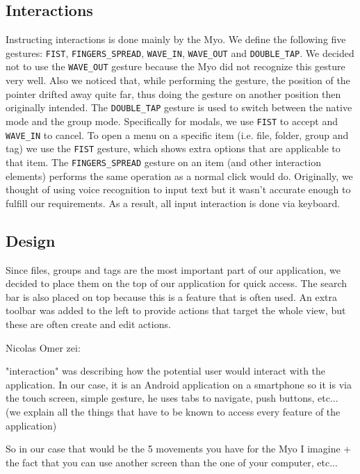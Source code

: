 \documentclass{article}
\begin{document}
\subsection{Interactions}
Instructing interactions is done mainly by the Myo. We define the following five gestures: \texttt{FIST}, \texttt{FINGERS\_SPREAD}, \texttt{WAVE\_IN}, \texttt{WAVE\_OUT} and \texttt{DOUBLE\_TAP}. We decided not to use the \texttt{WAVE\_OUT} gesture because the Myo did not recognize this gesture very well. Also we noticed that, while performing the gesture, the position of the pointer drifted away quite far, thus doing the gesture on another position then originally intended. The \texttt{DOUBLE\_TAP} gesture is used to switch between the native mode and the group mode. Specifically for modals, we use \texttt{FIST} to accept and \texttt{WAVE\_IN} to cancel. To open a menu on a specific item (i.e. file, folder, group and tag) we use the \texttt{FIST} gesture, which shows extra options that are applicable to that item. The \texttt{FINGERS\_SPREAD} gesture on an item (and other interaction elements) performs the same operation as a normal click would do. Originally, we thought of using voice recognition to input text but it wasn't accurate enough to fulfill our requirements. As a result, all input interaction is done via keyboard. 

\subsection{Design}

Since files, groups and tags are the most important part of our application, we decided to place them on the top of our application for quick access. The search bar is also placed on top because this is a feature that is often used. An extra toolbar was added to the left to provide actions that target the whole view, but these are often create and edit actions. 

 Nicolas Omer zei:

"interaction" was describing how the potential user would interact with the application. In our case, it is an Android application on a smartphone so it is via the touch screen, simple gesture, he uses tabs to navigate, push buttons, etc... (we explain all the things that have to be known to access every feature of the application)

So in our case that would be the 5 movements you have for the Myo I imagine + the fact that you can use another screen than the one of your computer, etc...
\end{document}
